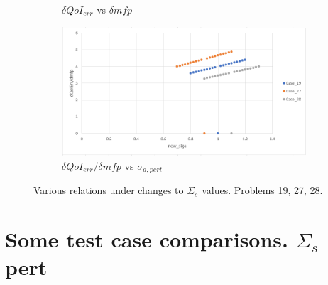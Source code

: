 \documentclass{article}
\begin{document}
\begin{figure}[H]
\begin{subfigure}{.49\textwidth}
  \caption{$\delta QoI_{err}$ vs $\delta mfp$}
  \label{fig:sub3}
\end{subfigure}
\begin{subfigure}{.49\textwidth}
  \centering
  \includegraphics[width=1\linewidth]{dQOIdivMfpVsSiga3.png}
  \caption{$\delta QoI_{err}/\delta mfp$ vs $\sigma_{a,pert}$}
  \label{fig:sub4}
\end{subfigure}
\caption{Various relations under changes to $\Sigma_s$ values. Problems 19, 27, 28.}
\label{fig:Comp1}
\end{figure}

\section{Some test case comparisons. $\Sigma_s$ pert}
\end{document}
